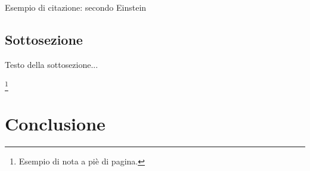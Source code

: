 \documentclass[a4paper,12pt]{article}
\begin{document}
Esempio di citazione: secondo Einstein \cite{einstein1905}

\subsection{Sottosezione}
Testo della sottosezione...

\footnote{Esempio di nota a piè di pagina.}

\section{Conclusione}

\newpage %


\end{document}

